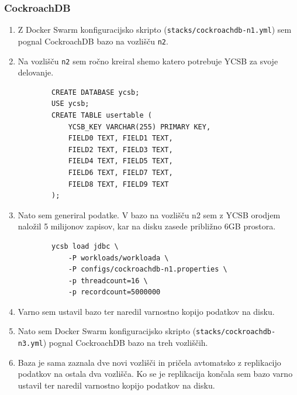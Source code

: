 \documentclass[a4paper, 12pt]{book}
\begin{document}
\subsubsection{CockroachDB}
\begin{enumerate}
    \item Z Docker Swarm konfiguracijsko skripto (\texttt{stacks/cockroachdb-n1.yml}) sem pognal CockroachDB bazo na vozlišču \texttt{n2}.
    \item Na vozlišču \texttt{n2} sem ročno kreiral shemo katero potrebuje YCSB za svoje delovanje.
    \begin{listing}[H]
    \begin{verbatim}
        CREATE DATABASE ycsb;
        USE ycsb;
        CREATE TABLE usertable (
            YCSB_KEY VARCHAR(255) PRIMARY KEY,
            FIELD0 TEXT, FIELD1 TEXT,
            FIELD2 TEXT, FIELD3 TEXT,
            FIELD4 TEXT, FIELD5 TEXT,
            FIELD6 TEXT, FIELD7 TEXT,
            FIELD8 TEXT, FIELD9 TEXT
        );
    \end{verbatim}
    \label{code-ycsb-schema-cockroach}
    \end{listing}
    \item Nato sem generiral podatke. V bazo na vozlišču n2 sem z YCSB orodjem naložil 5 milijonov zapisov, kar na disku zasede približno 6GB prostora.
    \begin{listing}[H]
    \begin{verbatim}
        ycsb load jdbc \
            -P workloads/workloada \
            -P configs/cockroachdb-n1.properties \
            -p threadcount=16 \
            -p recordcount=5000000
    \end{verbatim}
    \label{code-ycsb-load-cockroach}
    \end{listing}
    \item Varno sem ustavil bazo ter naredil varnostno kopijo podatkov na disku.
    \item Nato sem Docker Swarm konfiguracijsko skripto (\texttt{stacks/cockroachdb-n3.yml}) pognal CockroachDB bazo na treh vozliščih.
    \item Baza je sama zaznala dve novi vozlišči in pričela avtomatsko z replikacijo podatkov na ostala dva vozlišča. Ko se je replikacija končala sem bazo varno ustavil ter naredil varnostno kopijo podatkov na disku.
\end{enumerate}
\end{document}
